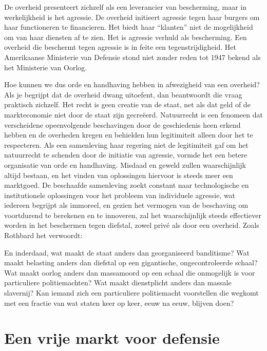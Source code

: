 De overheid presenteert zichzelf als een leverancier van bescherming, maar in werkelijkheid is het agressie. De overheid initieert agressie tegen haar burgers om haar functioneren te financieren. Het biedt haar ``klanten'' niet de mogelijkheid om van haar diensten af te zien. Het is agressie verhuld als bescherming. Een overheid die beschermt tegen agressie is in feite een tegenstrijdigheid. Het Amerikaanse Ministerie van Defensie stond niet zonder reden tot 1947 bekend als het Ministerie van Oorlog.

Hoe kunnen we dus orde en handhaving hebben in afwezigheid van een overheid? Als je begrijpt dat de overheid dwang uitoefent, dan beantwoordt die vraag praktisch zichzelf. Het recht is geen creatie van de staat, net als dat geld of de markteconomie niet door de staat zijn gecreëerd. Natuurrecht is een fenomeen dat verscheidene opeenvolgende beschavingen door de geschiedenis heen erkend hebben en de overheden kregen en behielden hun legitimiteit alleen door het te respecteren. Als een samenleving haar regering niet de legitimiteit gaf om het natuurrecht te schenden door de initiatie van agressie, vormde het een betere organisatie van orde en handhaving. Misdaad en geweld zullen waarschijnlijk altijd bestaan, en het vinden van oplossingen hiervoor is steeds meer een marktgoed. De beschaafde samenleving zoekt constant naar technologische en institutionele oplossingen voor het probleem van individuele agressie, wat iedereen begrijpt als immoreel, en gezien het vermogen van de beschaving om voortdurend te berekenen en te innoveren, zal het waarschijnlijk steeds effectiever worden in het beschermen tegen diefstal, zowel privé als door een overheid. Zoals Rothbard het verwoordt:

\begin{blockquotebox}
En inderdaad, wat maakt de staat anders dan georganiseerd banditisme? Wat maakt belasting anders dan diefstal op een gigantische, ongecontroleerde schaal? Wat maakt oorlog anders dan massamoord op een schaal die onmogelijk is voor particuliere politiemachten? Wat maakt dienstplicht anders dan massale slavernij? Kan iemand zich een particuliere politiemacht voorstellen die wegkomt met een fractie van wat staten keer op keer, eeuw na eeuw, blijven doen?\footnotemark
\end{blockquotebox}
\autocite{209}

\hypertarget{een-vrije-markt-voor-bescherming}{%
\section{Een vrije markt voor defensie}\label{een-vrije-markt-voor-bescherming}}

